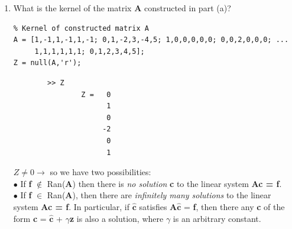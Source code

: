 \documentclass[14pt,a4paper]{article}
\begin{document}
\begin{enumerate}
		\item What is the kernel of the matrix \textbf{A} constructed in part (a)? 
		\begin{lstlisting}
% Kernel of constructed matrix A
A = [1,-1,1,-1,1,-1; 0,1,-2,3,-4,5; 1,0,0,0,0,0; 0,0,2,0,0,0; ...
     1,1,1,1,1,1; 0,1,2,3,4,5];
Z = null(A,'r');
		\end{lstlisting}
		\begin{lstlisting}
		>> Z
				Z =   0
					  1
					  0
					 -2
					  0
					  1
		\end{lstlisting}
		$Z \neq 0 \rightarrow $ so we have two possibilities: \\ 
		$\bullet$ If \textbf{f} $\notin$ Ran(\textbf{A}) then there is \textit{no solution} \textbf{c} to the linear system \textbf{Ac = f}. \\
		$\bullet$ If \textbf{f} $\in$ Ran(\textbf{A}), then there are \textit{infinitely many solutions} to the linear system \textbf{Ac = f}. In particular, if $\hat{\textbf{c}}$ satisfies \textbf{A}$\hat{\textbf{c}}$ = \textbf{f}, then there any \textbf{c} of the form \textbf{c} =  $\hat{\textbf{c}}$ + $\gamma$\textbf{z} is also a solution, where $\gamma$ is an arbitrary constant. \\
		

\end{enumerate}
\end{document}
